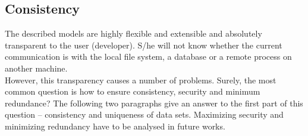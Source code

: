 %
%
%
%
%
%
%

\subsection{Consistency}
\label{consistency_heading}

The described models are highly flexible and extensible and absolutely transparent
to the user (developer). S/he will not know whether the current communication is
with the local file system, a database or a remote process on another machine.\\
However, this transparency causes a number of problems. Surely, the most common
question is how to ensure consistency, security and minimum redundance?
The following two paragraphs give an answer to the first part of this question
-- consistency and uniqueness of data sets. Maximizing security and minimizing
redundancy have to be analysed in future works.




